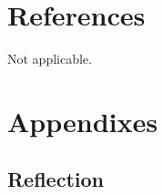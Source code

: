 \documentclass{article}
\begin{document}
\section{References}
\noindent Not applicable.
\newpage
\section{Appendixes}
\subsection{Reflection}

\end{document}
